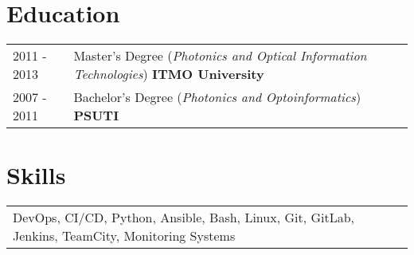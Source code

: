 \documentclass[a4paper,12pt]{article}
\begin{document}
\section{Education}
\begin{tabularx}{\linewidth}{@{}l X@{}}	
2011 - 2013 & Master’s Degree (\textit{Photonics and Optical Information Technologies}) \hfill \textbf{ITMO University}  \\ 
2007 - 2011 & Bachelor's Degree (\textit{Photonics and Optoinformatics}) \hfill \textbf{PSUTI} \\ 
\end{tabularx}

\section{Skills}
\begin{tabularx}{\linewidth}{@{}l X@{}}
\normalsize{DevOps, CI/CD, Python, Ansible, Bash, Linux, Git, GitLab, Jenkins, TeamCity, Monitoring Systems}\\
\end{tabularx}

\vfill
{}
\end{document}
